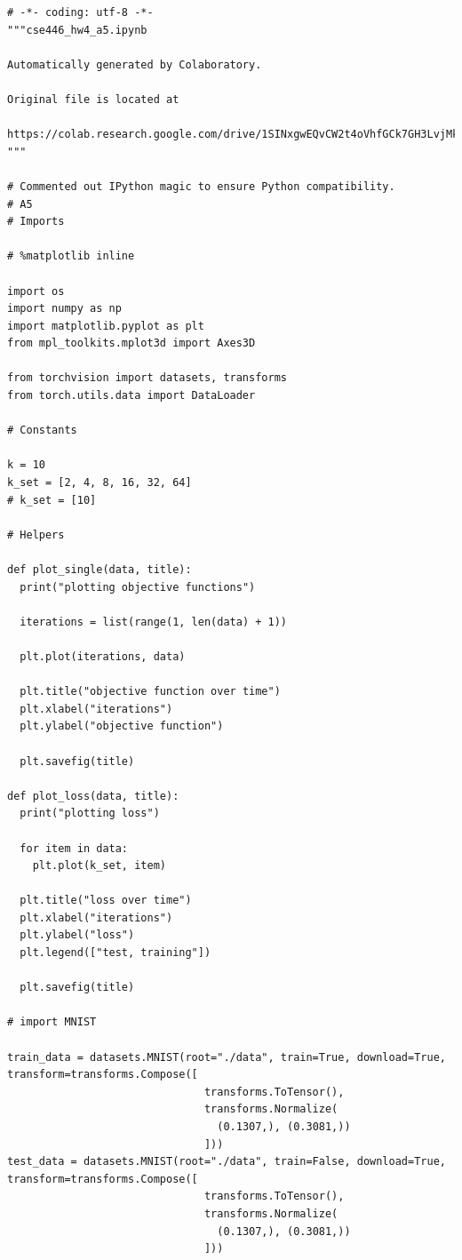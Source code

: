 \documentclass{article}
\newcommand{\1}{\mathbf{1}}
\begin{document}
{\newpage

\begin{verbatim}
# -*- coding: utf-8 -*-
"""cse446_hw4_a5.ipynb

Automatically generated by Colaboratory.

Original file is located at
    https://colab.research.google.com/drive/1SINxgwEQvCW2t4oVhfGCk7GH3LvjMkmZ
"""

# Commented out IPython magic to ensure Python compatibility.
# A5
# Imports

# %matplotlib inline

import os
import numpy as np
import matplotlib.pyplot as plt
from mpl_toolkits.mplot3d import Axes3D

from torchvision import datasets, transforms
from torch.utils.data import DataLoader

# Constants 

k = 10
k_set = [2, 4, 8, 16, 32, 64]
# k_set = [10]

# Helpers

def plot_single(data, title):
  print("plotting objective functions")

  iterations = list(range(1, len(data) + 1))

  plt.plot(iterations, data)

  plt.title("objective function over time")
  plt.xlabel("iterations")
  plt.ylabel("objective function")

  plt.savefig(title)

def plot_loss(data, title):
  print("plotting loss")

  for item in data:
    plt.plot(k_set, item)

  plt.title("loss over time")
  plt.xlabel("iterations")
  plt.ylabel("loss")
  plt.legend(["test, training"])

  plt.savefig(title)

# import MNIST

train_data = datasets.MNIST(root="./data", train=True, download=True, transform=transforms.Compose([
                               transforms.ToTensor(),
                               transforms.Normalize(
                                 (0.1307,), (0.3081,))
                               ]))
test_data = datasets.MNIST(root="./data", train=False, download=True, transform=transforms.Compose([
                               transforms.ToTensor(),
                               transforms.Normalize(
                                 (0.1307,), (0.3081,))
                               ]))


\end{verbatim}}
\end{document}
